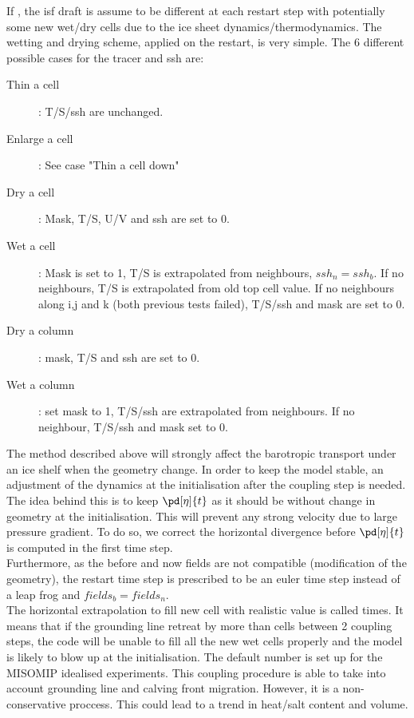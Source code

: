 \documentclass[../main/NEMO_manual]{subfiles}
\begin{document}
If , the isf draft is assume to be different at each restart step with
potentially some new wet/dry cells due to the ice sheet dynamics/thermodynamics.
The wetting and drying scheme, applied on the restart, is very simple. The 6 different possible cases for the tracer and ssh are:

\begin{description}
   \item[Thin a cell]:
   T/S/ssh are unchanged.

   \item[Enlarge  a cell]:
   See case "Thin a cell down"

   \item[Dry a cell]:
   Mask, T/S, U/V and ssh are set to 0.

   \item[Wet a cell]: 
   Mask is set to 1, T/S is extrapolated from neighbours, $ssh_n = ssh_b$.
   If no neighbours, T/S is extrapolated from old top cell value. 
   If no neighbours along i,j and k (both previous tests failed), T/S/ssh and mask are set to 0.

   \item[Dry a column]:
   mask, T/S and ssh are set to 0.

   \item[Wet a column]:
   set mask to 1, T/S/ssh are extrapolated from neighbours.
   If no neighbour, T/S/ssh and mask set to 0.
\end{description}

The method described above will strongly affect the barotropic transport under an ice shelf when the geometry change.
In order to keep the model stable, an adjustment of the dynamics at the initialisation after the coupling step is needed. 
The idea behind this is to keep $\pd[\eta]{t}$ as it should be without change in geometry at the initialisation. 
This will prevent any strong velocity due to large pressure gradient. 
To do so, we correct the horizontal divergence before $\pd[\eta]{t}$ is computed in the first time step.\\

Furthermore, as the before and now fields are not compatible (modification of the geometry),
the restart time step is prescribed to be an euler time step instead of a leap frog and $fields_b = fields_n$.\\

The horizontal extrapolation to fill new cell with realistic value is called  times.
It means that if the grounding line retreat by more than  cells between 2 coupling steps,
the code will be unable to fill all the new wet cells properly and the model is likely to blow up at the initialisation.
The default number is set up for the MISOMIP idealised experiments.
This coupling procedure is able to take into account grounding line and calving front migration.
However, it is a non-conservative proccess. 
This could lead to a trend in heat/salt content and volume.\\
\end{document}
